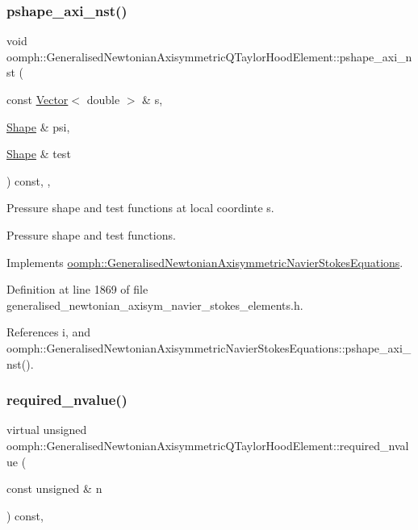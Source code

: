 \subsubsection{\texorpdfstring{pshape\+\_\+axi\+\_\+nst()}{pshape\_axi\_nst()}\hspace{0.1cm}{\footnotesize\ttfamily [2/2]}}
{\footnotesize\ttfamily void oomph\+::\+Generalised\+Newtonian\+Axisymmetric\+Q\+Taylor\+Hood\+Element\+::pshape\+\_\+axi\+\_\+nst (\begin{DoxyParamCaption}\item[{const \hyperlink{classoomph_1_1Vector}{Vector}$<$ double $>$ \&}]{s,  }\item[{\hyperlink{classoomph_1_1Shape}{Shape} \&}]{psi,  }\item[{\hyperlink{classoomph_1_1Shape}{Shape} \&}]{test }\end{DoxyParamCaption}) const\hspace{0.3cm}{\ttfamily [inline]}, {\ttfamily [protected]}, {\ttfamily [virtual]}}



Pressure shape and test functions at local coordinte s. 

Pressure shape and test functions. 

Implements \hyperlink{classoomph_1_1GeneralisedNewtonianAxisymmetricNavierStokesEquations_a278087089b3cd5b354b57b997ce7a224}{oomph\+::\+Generalised\+Newtonian\+Axisymmetric\+Navier\+Stokes\+Equations}.



Definition at line 1869 of file generalised\+\_\+newtonian\+\_\+axisym\+\_\+navier\+\_\+stokes\+\_\+elements.\+h.



References i, and oomph\+::\+Generalised\+Newtonian\+Axisymmetric\+Navier\+Stokes\+Equations\+::pshape\+\_\+axi\+\_\+nst().

\mbox{\label{classoomph_1_1GeneralisedNewtonianAxisymmetricQTaylorHoodElement_a1a0b75b3b43b92a5b85909886d1a94ab}} 
\subsubsection{\texorpdfstring{required\+\_\+nvalue()}{required\_nvalue()}}
{\footnotesize\ttfamily virtual unsigned oomph\+::\+Generalised\+Newtonian\+Axisymmetric\+Q\+Taylor\+Hood\+Element\+::required\+\_\+nvalue (\begin{DoxyParamCaption}\item[{const unsigned \&}]{n }\end{DoxyParamCaption}) const\hspace{0.3cm}{\ttfamily [inline]}, {\ttfamily [virtual]}}



